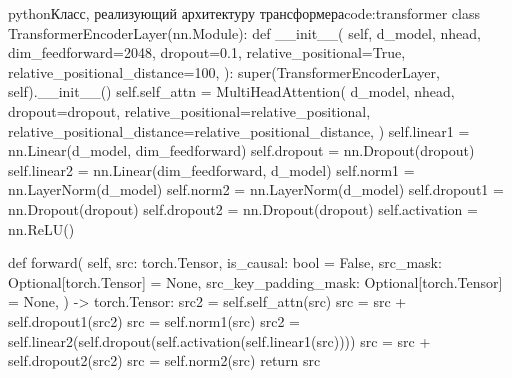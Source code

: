 \begin{mintedbox}[]{python}{Класс, реализующий архитектуру трансформера}{code:transformer}
class TransformerEncoderLayer(nn.Module):
    def __init__(
        self, d_model, nhead, dim_feedforward=2048,
        dropout=0.1, relative_positional=True,
        relative_positional_distance=100,
    ):
        super(TransformerEncoderLayer, self).__init__()
        self.self_attn = MultiHeadAttention(
            d_model, nhead, dropout=dropout,
            relative_positional=relative_positional,
            relative_positional_distance=relative_positional_distance,
        )
        self.linear1 = nn.Linear(d_model, dim_feedforward)
        self.dropout = nn.Dropout(dropout)
        self.linear2 = nn.Linear(dim_feedforward, d_model)
        self.norm1 = nn.LayerNorm(d_model)
        self.norm2 = nn.LayerNorm(d_model)
        self.dropout1 = nn.Dropout(dropout)
        self.dropout2 = nn.Dropout(dropout)
        self.activation = nn.ReLU()

    def forward(
        self, src: torch.Tensor, is_causal: bool = False,
        src_mask: Optional[torch.Tensor] = None,
        src_key_padding_mask: Optional[torch.Tensor] = None, 
    ) -> torch.Tensor:
        src2 = self.self_attn(src)
        src = src + self.dropout1(src2)
        src = self.norm1(src)
        src2 = self.linear2(self.dropout(self.activation(self.linear1(src))))
        src = src + self.dropout2(src2)
        src = self.norm2(src)
        return src
\end{mintedbox}

